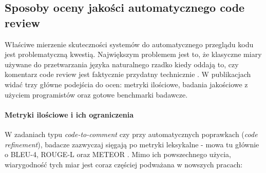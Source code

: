 \subsection{Sposoby oceny jakości automatycznego code review}
\label{subsec:llm_acr_eval}

Właściwe mierzenie skuteczności systemów do automatycznego przeglądu kodu jest problematyczną kwestią.
Największym problemem jest to, że klasyczne miary używane do przetwarzania języka naturalnego rzadko kiedy
oddają to, czy komentarz code review jest faktycznie przydatny technicznie \cite{Lin2025CodeReviewQA, Zhang2024SurveyLLMSE}.
W publikacjach widać trzy główne podejścia do ocen: metryki ilościowe, badania jakościowe z użyciem programistów oraz
gotowe benchmarki badawcze.

\paragraph{Metryki ilościowe i ich ograniczenia}
W zadaniach typu \textit{code-to-comment} czy przy automatycznych poprawkach (\textit{code refinement}), badacze zazwyczaj sięgają po 
metryki leksykalne - mowa tu głównie o BLEU-4, ROUGE-L oraz METEOR \cite{Lin2025CodeReviewQA, Meng2025RARe, Yu2024Carllm}. 
Mimo ich powszechnego użycia, wiarygodność tych miar jest coraz częściej podważana w nowszych pracach:

